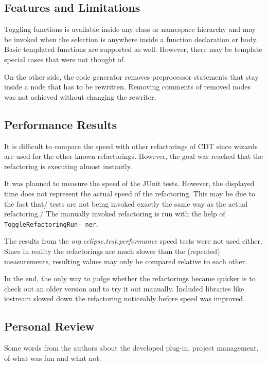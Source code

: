\subsection{Features and Limitations}

Toggling functions is available inside any class or namespace hierarchy and may 
be invoked when the selection is anywhere inside a function declaration or
body. 
Basic templated functions are supported as well. However, there may be 
template special cases that were not thought of.

On the other side, the code generator removes preprocessor statements that stay 
inside a node that has to be rewritten. Removing comments of removed nodes was 
not achieved without changing the rewriter.

\subsection{Performance Results}

It is difficult to compare the speed with other refactorings of CDT since
wizards are used for the other known refactorings. However, the goal was reached
that the refactoring is executing almost instantly.

It was planned to measure the speed of the JUnit tests. However, the displayed 
time does not represent the actual speed of the refactoring. This may be due to 
the fact that/ tests are not being invoked exactly the same way as the actual 
refactoring./ The manually invoked refactoring is run with the help of
\texttt{ToggleRefactoringRun- ner}.

The results from the \textit{org.eclipse.test.performance} speed tests were not 
used either. Since in reality the refactorings are much slower than the 
(repeated) measurements, resulting values may only be compared relative to each 
other.

In the end, the only way to judge whether the refactorings became quicker is to 
check out an older version and to try it out manually. Included libraries like
iostream slowed down the refactoring noticeably before speed was improved.

\subsection{Personal Review}

Some words from the authors about the developed plug-in, project management, of 
what was fun and what not.

